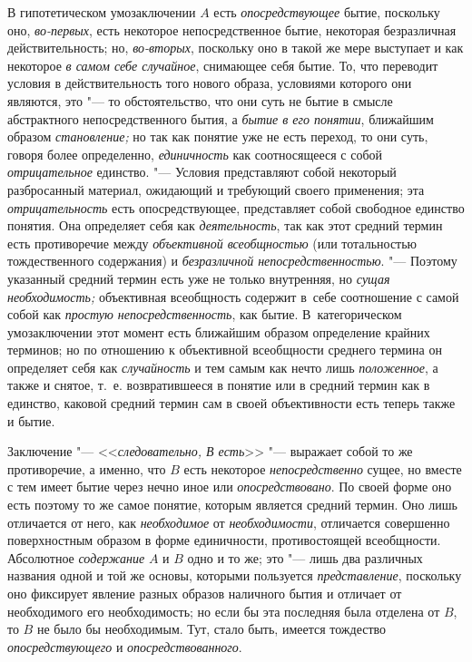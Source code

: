 В гипотетическом умозаключении $A$ есть
{\em опосредствующее} бытие, поскольку оно, {\em во-первых}, есть
некоторое непосредственное бытие, некоторая безразличная действительность;
но, {\em во-вторых}, поскольку оно в такой же мере выступает и как некоторое
{\em в самом себе случайное},
снимающее себя бытие. То, что переводит условия в
действительность того нового образа, условиями которого они являются, это
"--- то обстоятельство, что они суть не бытие в смысле
абстрактного непосредственного бытия, а
{\em бытие в его понятии}, ближайшим образом {\em становление;} но так
как понятие уже не есть переход, то они суть, говоря более определенно,
{\em единичность} как
соотносящееся с собой {\em отрицательное} единство. "--- Условия
представляют собой некоторый разбросанный материал,
ожидающий и требующий своего применения; эта {\em отрицательность}
есть опосредствующее, представляет собой свободное единство
понятия. Она определяет себя как {\em деятельность}, так
как этот средний термин есть противоречие между
{\em объективной всеобщностью}
(или тотальностью тождественного содержания) и
{\em безразличной непосредственностью}.
"--- Поэтому указанный средний термин есть уже не только
внутренняя, но {\em сущая необходимость;} объективная всеобщность содержит
в~себе соотношение с самой собой как {\em простую непосредственность},
как бытие. В~категорическом умозаключении этот момент есть
ближайшим образом определение крайних терминов; но по отношению к
объективной всеобщности среднего термина он определяет себя как
{\em случайность} и тем самым как нечто лишь {\em положенное},
а также и снятое, т.~е. возвратившееся в понятие или в
средний термин как в единство, каковой средний термин сам в своей
объективности есть теперь также и бытие.

Заключение "--- <<{\em следовательно, В есть}>>
"--- выражает собой то же противоречие, а именно, что
$B$ есть некоторое {\em непосредственно}
сущее, но вместе с тем имеет бытие через нечно иное или
{\em опосредствовано}.
По своей форме оно есть поэтому то же самое понятие, которым
является средний термин. Оно лишь отличается от него, как
{\em необходимое} от {\em необходимости},
отличается совершенно поверхностным образом в форме
единичности, противостоящей всеобщности. Абсолютное
{\em содержание} $A$ и $B$ одно и то же;
это "--- лишь два различных названия одной и той же основы,
которыми пользуется {\em представление},
поскольку оно фиксирует явление разных образов наличного
бытия и отличает от необходимого его необходимость; но если бы эта
последняя была отделена от $B$, то $B$ не было бы необходимым.
Тут, стало быть, имеется тождество {\em опосредствующего} и
{\em опосредствованного}.

